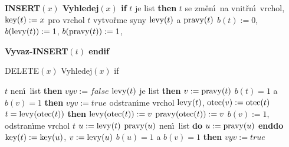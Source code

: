 {\bf INSERT$(x)$\newline 
Vyhledej$(x)$\newline 
if} $t$ je list {\bf then}\newline 
\phantom{---}$t$ se zm\v en\'\i\ na vnit\v rn\'\i\ vrchol, $\operatorname{key}(t):=x$\newline 
\phantom{---}pro vrchol $t$ vytvo\v rme syny $\operatorname{levy}(t)$ a $\operatorname{pravy}(t)$\newline 
\phantom{---}$b(t):=0$, $b(\operatorname{levy}(t)):=1$, $b(\operatorname{pravy}(t)):=1$, {\bf Vyvaz-INSERT$(t)$\newline
endif
\medskip

DELETE$(x)$\newline 
Vyhledej$(x)$\newline 
if} $t$ nen\'\i\ list {\bf then}\newline 
\phantom{---}$vyv:=false$ \newline 
\phantom{---}{\bf if} $\operatorname{levy}(t)$ je list {\bf then}\newline 
\phantom{------}$v:=\operatorname{pravy}(t)$\newline 
\phantom{------}{\bf if} $b(t)=1$ a $b(v)=1$ {\bf then}\newline 
\phantom{---------}$vyv:=true$\newline 
\phantom{------}{\bf endif}\newline 
\phantom{------}odstran\'\i me vrchol $\operatorname{levy}(t)$, $\operatorname{otec}(v):=\operatorname{otec}(t)$\newline 
\phantom{------}{\bf if} $t=\operatorname{levy}(\operatorname{otec}(t))$ {\bf then}\newline 
\phantom{---------}$\operatorname{levy}(\operatorname{otec}(t)):=v$\newline 
\phantom{------}{\bf else}\newline 
\phantom{---------}$\operatorname{pravy}(\operatorname{otec}(t)):=v$\newline 
\phantom{------}{\bf endif}\newline 
\phantom{------}$b(v):=1$, odstran\'\i me vrchol $t$\newline 
\phantom{---}{\bf else}\newline 
\phantom{------}$u:=\operatorname{levy}(t)$\newline 
\phantom{------}{\bf while} $\operatorname{pravy}(u)$ nen\'\i\ list {\bf do} $u:=\operatorname{pravy}(u)$ {\bf enddo}\newline 
\phantom{------}$\operatorname{key}(t):=\operatorname{key}(u)$, $v:=\operatorname{levy}(u)$ \newline 
\phantom{------}{\bf if} $b(u)=1$ a $b(v)=1$ {\bf then}\newline 
\phantom{---------}$vyv:=true$\newline 
\phantom{------}{\bf endif}\newline 
